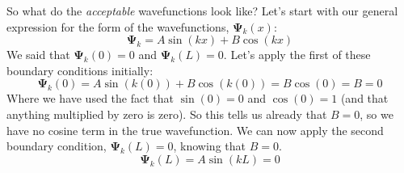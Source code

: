 \documentclass{memoir}[11pt,oneside,a4paper,openany]
\newcommand{\wf}{\ensuremath{\bm{\Psi}}\xspace}
\begin{document}
So what do the \emph{acceptable} wavefunctions look like? Let's start with our general expression for the form of the wavefunctions, $\wf_k(x)$:
\begin{equation}
	\wf_k = A\sin(kx) + B\cos(kx)
\end{equation}
We said that $\wf_k(0) = 0$ and $\wf_k(L) = 0$. Let's apply the first of these boundary conditions initially:
\begin{equation}
	\wf_k(0) = A\sin(k(0)) + B\cos(k(0)) = B\cos(0) = B = 0
\end{equation}
Where we have used the fact that $\sin(0) = 0$ and $\cos(0) = 1$ (and that anything multiplied by zero is zero). So this tells us already that $B=0$, so we have no cosine term in the true wavefunction. We can now apply the second boundary condition, $\wf_k(L) = 0$, knowing that $B=0$.
\begin{equation}
	\wf_k(L) = A\sin(kL) = 0
\end{equation}
\end{document}
